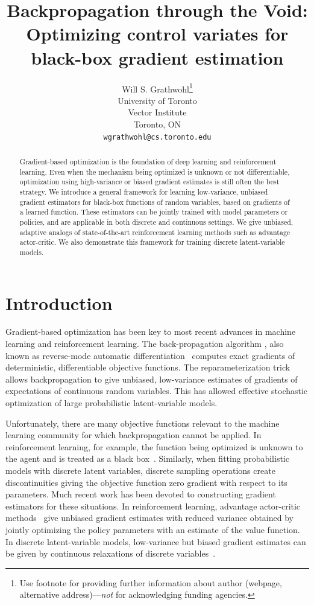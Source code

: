 \documentclass{article}
\title{Backpropagation through the Void:\\
Optimizing control variates for \\ black-box gradient estimation}
\author{
  Will S. Grathwohl\thanks{Use footnote for providing further
    information about author (webpage, alternative
    address)---\emph{not} for acknowledging funding agencies.} \\
  University of Toronto\\
  Vector Institute\\
  Toronto, ON \\
  \texttt{wgrathwohl@cs.toronto.edu} \\
}
\begin{document}
\maketitle
\begin{abstract}
Gradient-based optimization is the foundation of deep learning and reinforcement learning.
Even when the mechanism being optimized is unknown or not differentiable, optimization using high-variance or biased gradient estimates is still often the best strategy.
We introduce a general framework for learning low-variance, unbiased gradient estimators for black-box functions of random variables, based on gradients of a learned function.
These estimators can be jointly trained with model parameters or policies, and are applicable in both discrete and continuous settings.
We give unbiased, adaptive analogs of state-of-the-art reinforcement learning methods such as advantage actor-critic.
We also demonstrate this framework for training discrete latent-variable models.
\end{abstract}


\section{Introduction}
Gradient-based optimization has been key to most recent advances in machine learning and reinforcement learning.
The back-propagation algorithm \citep{rumelhart1986learning}, also known as reverse-mode automatic differentiation~\citep{speelpenning1980compiling, rall1981automatic} computes exact gradients of deterministic, differentiable objective functions.
The reparameterization trick \citep{williams1992simple, kingma2013autoencoding, rezende2014stochastic} allows backpropagation to give unbiased, low-variance estimates of gradients of expectations of continuous random variables.
This has allowed effective stochastic optimization of large probabilistic latent-variable models.

Unfortunately, there are many objective functions relevant to the machine learning community for which backpropagation cannot be applied. In reinforcement learning, for example, the function being optimized is unknown to the agent and is treated as a black box~\citep{schulman2015gradient}. Similarly, when fitting probabilistic models with discrete latent variables, discrete sampling operations create discontinuities giving the objective function zero gradient with respect to its parameters.
Much recent work has been devoted to constructing gradient estimators for these situations.
In reinforcement learning, advantage actor-critic methods~\citep{sutton2000policy} give unbiased gradient estimates with reduced variance obtained by jointly optimizing the policy parameters with an estimate of the value function.
In discrete latent-variable models, low-variance but biased gradient estimates can be given by continuous relaxations of discrete variables~\citep{maddison2016concrete, jang2016categorical}.
\end{document}
